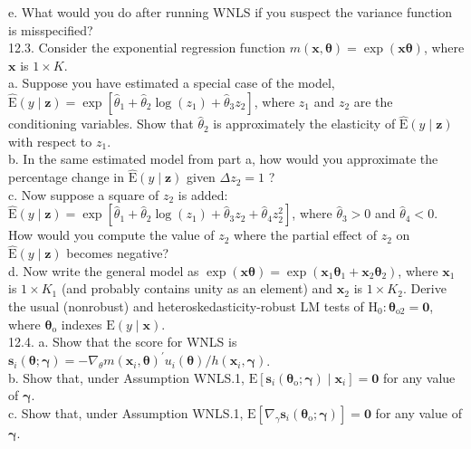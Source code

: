 \documentclass[10pt]{article}
\begin{document}
e. What would you do after running WNLS if you suspect the variance function is misspecified?\\
12.3. Consider the exponential regression function $m(\mathbf{x}, \boldsymbol{\theta})=\exp (\mathbf{x} \boldsymbol{\theta})$, where $\mathbf{x}$ is $1 \times K$.\\
a. Suppose you have estimated a special case of the model, $\hat{\mathrm{E}}(y \mid \mathbf{z})=\exp \left[\hat{\theta}_{1}+\right. \left.\hat{\theta}_{2} \log \left(z_{1}\right)+\hat{\theta}_{3} z_{2}\right]$, where $z_{1}$ and $z_{2}$ are the conditioning variables. Show that $\hat{\theta}_{2}$ is approximately the elasticity of $\hat{\mathrm{E}}(y \mid \mathbf{z})$ with respect to $z_{1}$.\\
b. In the same estimated model from part a, how would you approximate the percentage change in $\hat{\mathrm{E}}(y \mid \mathbf{z})$ given $\Delta z_{2}=1$ ?\\
c. Now suppose a square of $z_{2}$ is added: $\hat{\mathrm{E}}(y \mid \mathbf{z})=\exp \left[\hat{\theta}_{1}+\hat{\theta}_{2} \log \left(z_{1}\right)+\hat{\theta}_{3} z_{2}+\right. \left.\hat{\theta}_{4} z_{2}^{2}\right]$, where $\hat{\theta}_{3}>0$ and $\hat{\theta}_{4}<0$. How would you compute the value of $z_{2}$ where the partial effect of $z_{2}$ on $\hat{\mathrm{E}}(y \mid \mathbf{z})$ becomes negative?\\
d. Now write the general model as $\exp (\mathbf{x} \boldsymbol{\theta})=\exp \left(\mathbf{x}_{1} \boldsymbol{\theta}_{1}+\mathbf{x}_{2} \boldsymbol{\theta}_{2}\right)$, where $\mathbf{x}_{1}$ is $1 \times K_{1}$ (and probably contains unity as an element) and $\mathbf{x}_{2}$ is $1 \times K_{2}$. Derive the usual (nonrobust) and heteroskedasticity-robust LM tests of $\mathrm{H}_{0}: \boldsymbol{\theta}_{\mathrm{o} 2}=\mathbf{0}$, where $\boldsymbol{\theta}_{\mathrm{o}}$ indexes $\mathrm{E}(y \mid \mathbf{x})$.\\
12.4. a. Show that the score for WNLS is $\mathbf{s}_{i}(\boldsymbol{\theta} ; \boldsymbol{\gamma})=-\nabla_{\theta} m\left(\mathbf{x}_{i}, \boldsymbol{\theta}\right)^{\prime} u_{i}(\boldsymbol{\theta}) / h\left(\mathbf{x}_{i}, \boldsymbol{\gamma}\right)$.\\
b. Show that, under Assumption WNLS.1, $\mathrm{E}\left[\mathbf{s}_{i}\left(\boldsymbol{\theta}_{\mathrm{o}} ; \boldsymbol{\gamma}\right) \mid \mathbf{x}_{i}\right]=\mathbf{0}$ for any value of $\boldsymbol{\gamma}$.\\
c. Show that, under Assumption WNLS.1, $\mathrm{E}\left[\nabla_{\gamma} \mathbf{s}_{i}\left(\boldsymbol{\theta}_{\mathrm{o}} ; \boldsymbol{\gamma}\right)\right]=\mathbf{0}$ for any value of $\boldsymbol{\gamma}$.\\
\end{document}
